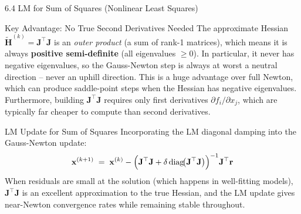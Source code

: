 \documentclass[aspectratio=169,10pt]{beamer}
\newcommand{\xbf}{\mathbf{x}}
\newcommand{\Hbf}{\mathbf{H}}
\begin{document}
\begin{frame}[allowframebreaks]{6.4 LM for Sum of Squares (Nonlinear Least Squares)}
  \framebreak

  \begin{alertblock}{Key Advantage: No True Second Derivatives Needed}
    The approximate Hessian $\tilde{\Hbf}^{(k)} = \mathbf{J}^\top\mathbf{J}$ is
    an \emph{outer product} (a sum of rank-1 matrices), which means it is always
    \textbf{positive semi-definite} (all eigenvalues $\geq 0$).  In particular,
    it never has negative eigenvalues, so the Gauss-Newton step is always at worst
    a neutral direction -- never an uphill direction.  This is a huge advantage
    over full Newton, which can produce saddle-point steps when the Hessian has
    negative eigenvalues.  Furthermore, building $\mathbf{J}^\top\mathbf{J}$
    requires only first derivatives $\partial f_i / \partial x_j$, which are
    typically far cheaper to compute than second derivatives.
  \end{alertblock}

  \begin{block}{LM Update for Sum of Squares}
    Incorporating the LM diagonal damping into the Gauss-Newton update:
    \[
      \xbf^{(k+1)} \;=\; \xbf^{(k)}
        - \Bigl(\mathbf{J}^\top\mathbf{J}
          + \delta\,\mathrm{diag}\!\bigl(\mathbf{J}^\top\mathbf{J}\bigr)\Bigr)^{-1}
          \mathbf{J}^\top \mathbf{r}
    \]
    When residuals are small at the solution (which happens in well-fitting
    models), $\mathbf{J}^\top\mathbf{J}$ is an excellent approximation to the
    true Hessian, and the LM update gives near-Newton convergence rates while
    remaining stable throughout.
  \end{block}

  \framebreak


\end{frame}
\end{document}
